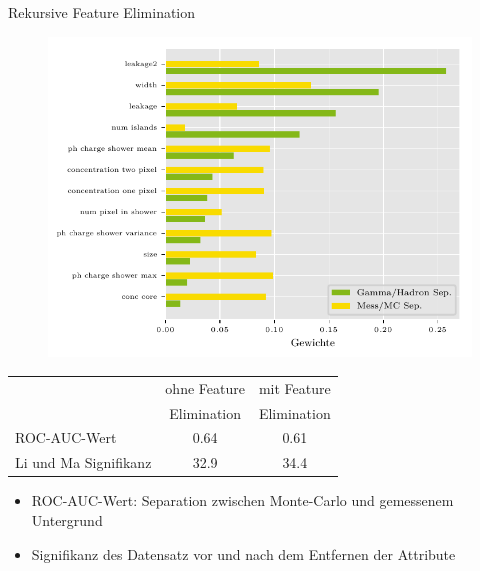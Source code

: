 \documentclass[aspectratio=1610, professionalfonts, 9pt]{beamer}
\begin{document}
\begin{frame}{Rekursive Feature Elimination}
  \begin{figure}
	\centering
	\includegraphics[height=0.9\textheight]{./Plots/feature_elemination.pdf}
  \end{figure}
\end{frame}

\begin{frame}
  \begin{table}
	\centering
	\begin{tabular}{l c c}
	  \toprule
	  & ohne Feature 	& mit Feature\\
	  & Elimination 	& Elimination\\
	  \cmidrule(r){2-3}
	  ROC-AUC-Wert            & \num{0.64} & \num{0.61} \\
	  Li und Ma Signifikanz   & \SI{32.9}{\sigma} & \SI{34.4}{\sigma} \\
	  \bottomrule
	\end{tabular}
  \end{table}
  \vspace{1cm}
  \begin{itemize}
	\item ROC-AUC-Wert: Separation zwischen Monte-Carlo und gemessenem Untergrund
	\item Signifikanz des Datensatz vor und nach dem Entfernen der Attribute
  \end{itemize}
\end{frame}
\end{document}
